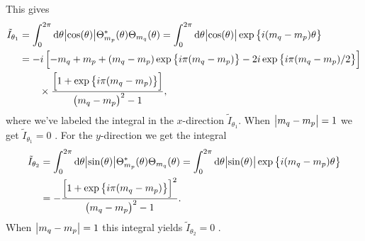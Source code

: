         This gives \cite{wolframalphatildei1}
        \begin{align}
            \tilde{I}_{\theta_1}
            &=
            \int_{0}^{2\pi}\dd \theta \abs{\cos(\theta)}
            \Theta_{m_p}^{*}(\theta)
            \Theta_{m_q}(\theta)
            =
            \int_{0}^{2\pi}\dd \theta \abs{\cos(\theta)}
            \exp\left\{ i(m_q - m_p)\theta \right\}
            \\
            &=
            -i\left[ 
                -m_q + m_p
                + (m_q - m_p)\exp\left\{ i\pi(m_q - m_p) \right\}
                - 2i\exp\left\{ 
                    i\pi(m_q - m_p)/2
                 \right\}
             \right]
            \\
            &\qquad
            \times
            \frac{
                \left[ 
                    1 + \exp\left\{ i\pi(m_q - m_p) \right\}
                 \right]
            }{
                \left( m_q - m_p \right)^2 - 1
            },
        \end{align}
        where we've labeled the integral in the $x$-direction
        $\tilde{I}_{\theta_1}$.
        When $\abs{m_q - m_p} = 1$ we get $\tilde{I}_{\theta_1} = 0$
        \cite{wolframalphatildei1-zero}.
        For the $y$-direction we get the integral \cite{wolframalphatildei2}
        \begin{align}
            \tilde{I}_{\theta_2}
            &=
            \int_{0}^{2\pi}\dd \theta \abs{\sin(\theta)}
            \Theta_{m_p}^{*}(\theta)
            \Theta_{m_q}(\theta)
            =
            \int_{0}^{2\pi}\dd \theta \abs{\sin(\theta)}
            \exp\left\{ i(m_q - m_p)\theta \right\}
            \\
            &=
            -\frac{
                \left[ 
                    1 + \exp\left\{ i \pi (m_q - m_p) \right\}
                 \right]^2
            }{
                \left( m_q - m_p \right)^2 - 1
            }.
        \end{align}
        When $\abs{m_q - m_p} = 1$ this integral yields $\tilde{I}_{\theta_2} =
        0$ \cite{wolframalphatildei2-zero}.

